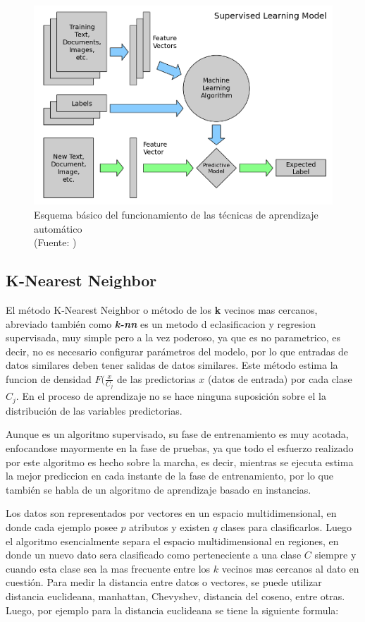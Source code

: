 \begin{figure}[ht!]
\centering
\includegraphics[width=.6\textwidth]{figures/image_machinelearning.png}
\caption[abs]{Esquema básico del funcionamiento de las técnicas de aprendizaje automático\\
{\scriptsize (Fuente: \cite{machineLearningBasic})}}
\label{fig:machineLearningBasic}
\end{figure}

\subsection{K-Nearest Neighbor}

El método K-Nearest Neighbor o método de los \textbf{k} vecinos mas cercanos, abreviado también como \textbf{\textit{k-nn}} es un metodo d eclasificacion y regresion supervisada, muy simple pero a la vez poderoso, ya que es no parametrico, es decir, no es necesario configurar parámetros del modelo, por lo que entradas de datos similares deben tener salidas de datos similares. Este método estima la funcion de densidad $F(\frac{x}{C_{j}}$ de las predictorias $x$ (datos de entrada) por cada clase $C_{j}$. En el proceso de aprendizaje no se hace ninguna suposición sobre el la distribución de las variables predictorias.

Aunque es un algoritmo supervisado, su fase de entrenamiento es muy acotada, enfocandose mayormente en la fase de pruebas, ya que todo el esfuerzo realizado por este algoritmo es hecho sobre la marcha, es decir, mientras se ejecuta estima la mejor prediccion en cada instante de la fase de entrenamiento, por lo que también se habla de un algoritmo de aprendizaje basado en instancias.

Los datos son representados por vectores en un espacio multidimensional, en donde cada ejemplo posee $p$ atributos y existen $q$ clases para clasificarlos. Luego el algoritmo esencialmente separa el espacio multidimensional en regiones, en donde un nuevo dato sera clasificado como perteneciente a una clase $C$ siempre y cuando esta clase sea la mas frecuente entre los $k$ vecinos mas cercanos al dato en cuestión. Para medir la distancia entre datos o vectores, se puede utilizar distancia euclideana, manhattan, Chevyshev, distancia del coseno, entre otras. Luego, por ejemplo para la distancia euclideana se tiene la siguiente formula:

